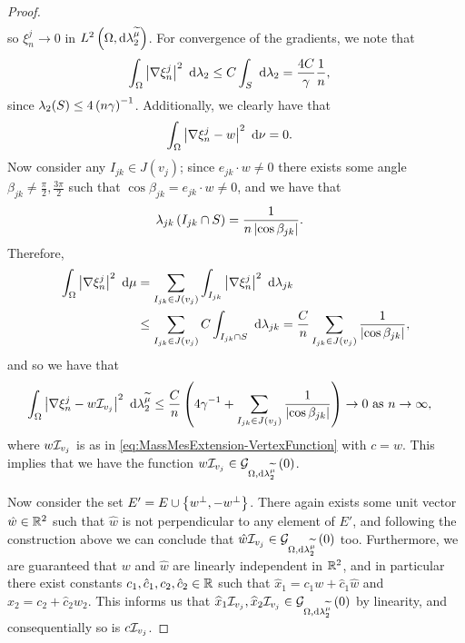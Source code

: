 \begin{proof}
\begin{align*}
	\end{align*}
	so $\xi_n^j\rightarrow0$ in $L^{2}\left( \Omega,\mathrm{d} \lambda_2^{\widetilde{\mu}} \right)$.
	For convergence of the gradients, we note that
	\begin{align*}
		\int_{\Omega}\left\lvert \nabla\xi_n^j \right\rvert^2 \ \mathrm{d}\lambda_2
		&\leq C\int_{S} \ \mathrm{d}\lambda_2 = \frac{4C}{\gamma}\frac{1}{n},
	\end{align*}
	since $\lambda_2(S)\leq 4\left( n\gamma \right)^{-1}$.
	Additionally, we clearly have that
	\begin{align*}
		\int_{\Omega}\left\lvert \nabla\xi_n^j - w \right\rvert^2 \ \mathrm{d}\nu &= 0.
	\end{align*}
	Now consider any $I_{jk}\in J(v_j)$; since $e_{jk}\cdot w\neq 0$ there exists some angle $\beta_{jk}\neq\frac{\pi}{2},\frac{3\pi}{2}$ such that $\cos\beta_{jk}=e_{jk}\cdot w\neq 0$, and we have that
	\begin{align*}
		\lambda_{jk}\left( I_{jk}\cap S \right) &= \frac{1}{n\left\lvert \cos\beta_{jk} \right\rvert}.
	\end{align*}
	Therefore,
	\begin{align*}
		\int_{\Omega}\left\lvert \nabla\xi_n^j \right\rvert^2 \ \mathrm{d}\mu
		&= \sum_{I_{jk}\in J(v_j)} \int_{I_{jk}}\left\lvert \nabla\xi_n^j \right\rvert^2 \ \mathrm{d}\lambda_{jk} \\
		&\leq \sum_{I_{jk}\in J(v_j)} C\int_{I_{jk}\cap S} \ \mathrm{d}\lambda_{jk}
		= \frac{C}{n} \sum_{I_{jk}\in J(v_j)} \frac{1}{\left\lvert \cos\beta_{jk} \right\rvert},
	\end{align*}
	and so we have that
	\begin{align*}
		\int_{\Omega}\left\lvert \nabla\xi_n^j - w\mathcal{I}_{v_j} \right\rvert^2 \ \mathrm{d}\lambda_2^{\widetilde{\mu}}
		&\leq \frac{C}{n}\left(  4\gamma^{-1} + \sum_{I_{jk}\in J(v_j)} \frac{1}{\left\lvert \cos\beta_{jk} \right\rvert}  \right)
		\rightarrow0 \ \text{as} \ n \rightarrow\infty,
	\end{align*}
	where $w\mathcal{I}_{v_j}$ is as in \eqref{eq:MassMesExtension-VertexFunction} with $c=w$.
	This implies that we have the function $w\mathcal{I}_{v_j}\in\mathcal{G}_{ \Omega, \mathrm{d}\lambda_2^{\widetilde{\mu}}}\left( 0 \right)$.
	
	Now consider the set $E' = E \cup \left\{ w^{\perp}, -w^{\perp} \right\}$.
	There again exists some unit vector $\hat{w}\in\mathbb{R}^2$ such that $\hat{w}$ is not perpendicular to any element of $E'$, and following the construction above we can conclude that $\hat{w}\mathcal{I}_{v_j}\in\mathcal{G}_{ \Omega, \mathrm{d}\lambda_2^{\widetilde{\mu}}}\left( 0 \right)$ too.
	Furthermore, we are guaranteed that $w$ and $\hat{w}$ are linearly independent in $\mathbb{R}^2$, and in particular there exist constants $c_1,\hat{c}_1,c_2,\hat{c}_2\in\mathbb{R}$ such that $\widehat{x}_1 = c_1 w + \hat{c}_1\hat{w}$ and $\widehat{x}_2 = c_2 + \hat{c}_2\hat{w}_2$.
	This informs us that $\widehat{x}_1\mathcal{I}_{v_j}, \widehat{x}_2\mathcal{I}_{v_j}\in\mathcal{G}_{ \Omega, \mathrm{d}\lambda_2^{\widetilde{\mu}}}\left( 0 \right)$ by linearity, and consequentially so is $c\mathcal{I}_{v_j}$.
\end{proof}

